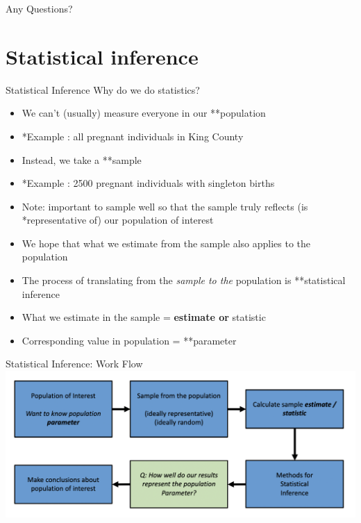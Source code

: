 \documentclass[
  ignorenonframetext,
]{beamer}
\begin{document}
\begin{frame}{}
\protect\hypertarget{section-3}{}
Any Questions?
\end{frame}

\hypertarget{statistical-inference}{%
\section{Statistical inference}\label{statistical-inference}}

\begin{frame}{Statistical Inference}
\protect\hypertarget{statistical-inference-1}{}
Why do we do statistics?

\begin{itemize}
\item
  We can't (usually) measure everyone in our **population
\item
  *Example : all pregnant individuals in King County
\item
  Instead, we take a **sample
\item
  *Example : 2500 pregnant individuals with singleton births
\item
  Note: important to sample well so that the sample truly reflects (is
  *representative of) our population of interest
\item
  We hope that what we estimate from the sample also applies to the
  population
\item
  The process of translating from the \emph{sample to the }population is
  **statistical inference
\item
  What we estimate in the sample = \textbf{estimate or }statistic
\item
  Corresponding value in population = **parameter
\end{itemize}
\end{frame}

\begin{frame}{Statistical Inference: Work Flow}
\protect\hypertarget{statistical-inference-work-flow}{}
\includegraphics{statinference_workflow.png}
\end{frame}
\end{document}
